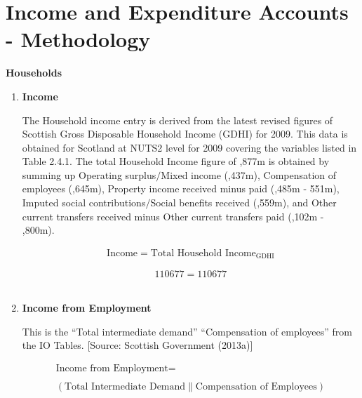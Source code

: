 \pagebreak


\newpage
\section{Income and Expenditure Accounts - Methodology}
\label{sec:2.5}

\bigskip
\begin{center}
\textbf{\LARGE Households}
\end{center}

\begin{enumerate}



\item \textbf {Income}

The Household income entry is derived from the latest revised figures of Scottish Gross Disposable Household Income (GDHI) for 2009. This data is obtained for Scotland at NUTS2 level for 2009 covering the variables listed in Table 2.4.1. The total Household Income figure of ,877m is obtained by summing up Operating surplus$/$Mixed income (,437m), Compensation of employees (,645m), Property income received minus paid (,485m - \textsterling551m), Imputed social contributions$/$Social benefits received (,559m), and Other current transfers received minus Other current transfers paid (,102m - ,800m). \cite{ONS2011b}


\begin{equation}
\begin{split}
\text{Income} =
\text{Total Household Income}_\text{GDHI}
\end{split} \label{eq:2.5.1}
\end{equation}

\begin{equation} \nonumber
110677 = 110677
\end{equation}\\

\item \textbf {Income from Employment}

This is the ``Total intermediate demand'' \text{|| }``Compensation of employees'' from the IO Tables. [Source: Scottish Government (2013a)] \cite{ScottishGovernment2013a}

\begin{equation}
\begin{split}
\text{Income from Employment} =  \\ \\
(\text{Total Intermediate Demand}\|\text{Compensation of Employees})
\end{split} \label{eq:2.5.2}
\end{equation}


\end{enumerate}

